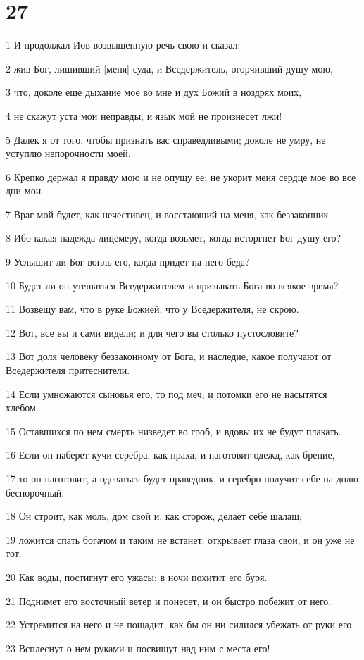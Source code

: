 \chapter{27}

\par 1 И продолжал Иов возвышенную речь свою и сказал:
\par 2 жив Бог, лишивший [меня] суда, и Вседержитель, огорчивший душу мою,
\par 3 что, доколе еще дыхание мое во мне и дух Божий в ноздрях моих,
\par 4 не скажут уста мои неправды, и язык мой не произнесет лжи!
\par 5 Далек я от того, чтобы признать вас справедливыми; доколе не умру, не уступлю непорочности моей.
\par 6 Крепко держал я правду мою и не опущу ее; не укорит меня сердце мое во все дни мои.
\par 7 Враг мой будет, как нечестивец, и восстающий на меня, как беззаконник.
\par 8 Ибо какая надежда лицемеру, когда возьмет, когда исторгнет Бог душу его?
\par 9 Услышит ли Бог вопль его, когда придет на него беда?
\par 10 Будет ли он утешаться Вседержителем и призывать Бога во всякое время?
\par 11 Возвещу вам, что в руке Божией; что у Вседержителя, не скрою.
\par 12 Вот, все вы и сами видели; и для чего вы столько пустословите?
\par 13 Вот доля человеку беззаконному от Бога, и наследие, какое получают от Вседержителя притеснители.
\par 14 Если умножаются сыновья его, то под меч; и потомки его не насытятся хлебом.
\par 15 Оставшихся по нем смерть низведет во гроб, и вдовы их не будут плакать.
\par 16 Если он наберет кучи серебра, как праха, и наготовит одежд, как брение,
\par 17 то он наготовит, а одеваться будет праведник, и серебро получит себе на долю беспорочный.
\par 18 Он строит, как моль, дом свой и, как сторож, делает себе шалаш;
\par 19 ложится спать богачом и таким не встанет; открывает глаза свои, и он уже не тот.
\par 20 Как воды, постигнут его ужасы; в ночи похитит его буря.
\par 21 Поднимет его восточный ветер и понесет, и он быстро побежит от него.
\par 22 Устремится на него и не пощадит, как бы он ни силился убежать от руки его.
\par 23 Всплеснут о нем руками и посвищут над ним с места его!

